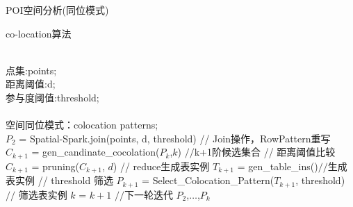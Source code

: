 \begin{frame}[t]{POI空间分析(同位模式)}

\begin{algorithm}[H]
\tiny
\caption{co-location算法}
\begin{algorithmic}[1]   
\REQUIRE  ~~\\  
点集:points;\\  
距离阈值:d;\\
参与度阈值:threshold;\\  
\ENSURE ~~\\  
空间同位模式：colocation patterns; \\
\pause
\STATE $P_2$ = Spatial-Spark.join(points, d, threshold)
\pause
\STATE // \alert{Join操作，RowPattern重写}
\STATE $C_{k+1}$ = gen\_candinate\_cocolation($P_k$,$k$) $//$k+1阶候选集合
\pause
\STATE // \alert{距离阈值比较}
\STATE $C_{k+1}$ = pruning($C_{k+1}$, $d$)
\pause
\STATE // \alert{reduce生成表实例}
\STATE $T_{k+1}$ = gen\_table\_ins()$//$生成表实例
\pause
\STATE // \alert{threshold 筛选}
\STATE $P_{k+1}$ = Select\_Colocation\_Pattern($T_{k+1}$, threshold) $//$ 筛选表实例
\pause
\STATE $k$ = $k+1$ $//$下一轮迭代
\pause
\ENDWHILE 
\pause
\RETURN $P_2$,$\dots$,$P_k$
\end{algorithmic}
\end{algorithm} 
\end{frame}


